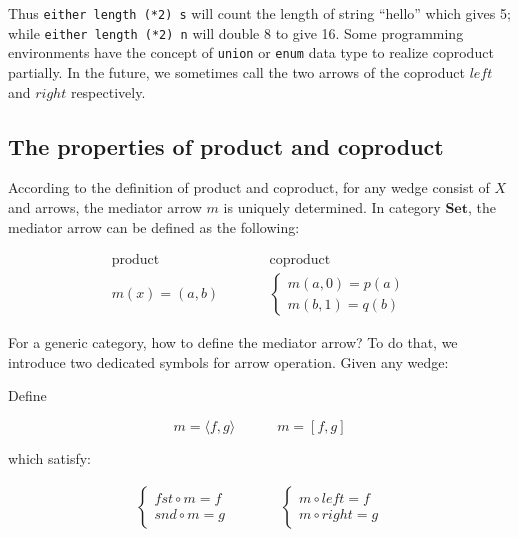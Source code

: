 \documentclass[b5paper]{article}
\begin{document}
Thus \texttt{either length (*2) s} will count the length of string ``hello'' which gives 5; while \texttt{either length (*2) n} will double 8 to give 16. Some programming environments have the concept of \texttt{union} or \texttt{enum} data type to realize coproduct partially. In the future, we sometimes call the two arrows of the coproduct $left$ and $right$ respectively.

\subsection{The properties of product and coproduct}

According to the definition of product and coproduct, for any wedge consist of $X$ and arrows, the mediator arrow $m$ is uniquely determined. In category $\pmb{Set}$, the mediator arrow can be defined as the following:

\[
\begin{array}{ccc}
\text{product} & & \text{coproduct} \\
m(x) = (a, b) & \quad \quad &
\begin{cases}
m (a, 0) = p(a) \\
m (b, 1) = q(b)
\end{cases}
\end{array}
\]

For a generic category, how to define the mediator arrow? To do that, we introduce two dedicated symbols for arrow operation. Given any wedge:

\begin{center}
\end{center}

Define

\[
m = \langle f, g \rangle \quad \quad \quad m =[f, g]
\]

which satisfy:

\[
\begin{array}{rcl}
\begin{cases}
fst \circ m = f \\
snd \circ m = g
\end{cases}
& \quad \quad &
\begin{cases}
m \circ left = f \\
m \circ right = g
\end{cases}
\end{array}
\]
\end{document}
